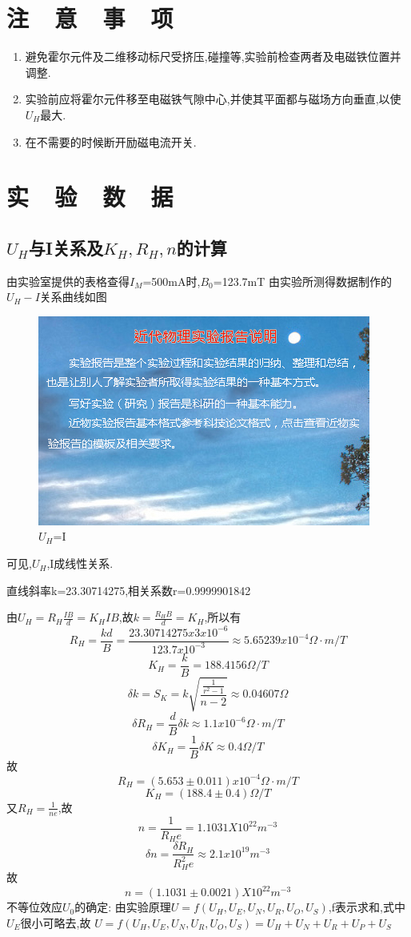 \documentclass{thuemp}
\begin{document}
\section{注~~意~~事~~项}
\begin{enumerate} 
	\item 避免霍尔元件及二维移动标尺受挤压,碰撞等,实验前检查两者及电磁铁位置并调整.
	\item 实验前应将霍尔元件移至电磁铁气隙中心,并使其平面都与磁场方向垂直,以使$U_{H}$最大.
	\item 在不需要的时候断开励磁电流开关.
\end{enumerate}
\section{实~~验~~数~~据}

\subsection{$U_{H}$与I关系及$K_{H},R_{H},n$的计算}

由实验室提供的表格查得$I_{M}$=500mA时,$B_{0}$=123.7mT
由实验所测得数据制作的$U_{H}-I$关系曲线如图
\begin{figure}[H]
	\centering
	\includegraphics[width=0.8\linewidth]{./image/example.jpg}
	\caption{$U_{H}$=I} \label{fig:eg}
\end{figure}
可见,$U_{H}$,I成线性关系.

直线斜率k=23.30714275,相关系数r=0.9999901842

由$U_{H}=R_{H}\frac{IB}{d}=K_{H}IB$,故$k=\frac{R_{H}B}{d}=K_{H}$,所以有
\[R_{H}=\frac{kd}{B}=\frac{23.30714275x3x10^{-6}}{123.7x10^{-3}}\approx5.65239x10^{-4} \Omega·m/T\]
\[K_{H}=\frac{k}{B}=188.4156 \Omega/T\]
\[\delta k =S_{K}=k\sqrt{\frac{\frac{1}{r^{2}-1}}{n-2}}\approx0.04607\Omega\]
\[\delta R_{H} = \frac{d}{B}\delta k \approx 1.1x10^{-6} \Omega·m/T\]
\[\delta K_{H} = \frac{1}{B}\delta K \approx 0.4\Omega/T\]
故\[R_{H}=(5.653\pm0.011)x10^{-4} \Omega ·m/T\]
\[K_{H}=(188.4\pm 0.4 )\Omega /T\]
又$R_{H}=\frac{1}{ne}$,故\[n=\frac{1}{R_{H}e}=1.1031X10^{22}m^{-3}\]
\[\delta n =\frac{\delta R_{H}}{R_{H}^{2}e}\approx2.1x10^{19}m^{-3}\]
故\[n=(1.1031\pm0.0021)X10^{22}m^{-3}\]
不等位效应$U_{0}$的确定:
由实验原理$U=f(U_{H},U_{E},U_{N},U_{R},U_{O},U_{S})$,f表示求和,式中$U_{E}$很小可略去,故
$U=f(U_{H},U_{E},U_{N},U_{R},U_{O},U_{S})=U_{H}+U_{N}+U_{R}+U_{P}+U_{S}$
\end{document}
